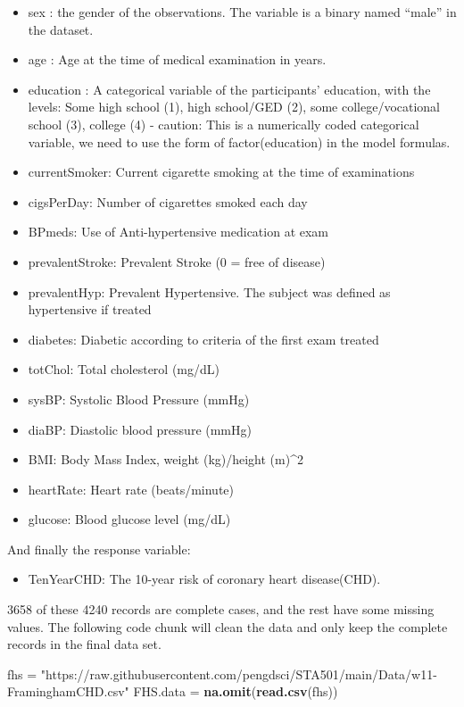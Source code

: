 \documentclass[
]{book}
\newenvironment{Shaded}{\begin{snugshade}}{\end{snugshade}}
\newcommand{\FunctionTok}[1]{\textcolor[rgb]{0.13,0.29,0.53}{\textbf{#1}}}
\newcommand{\NormalTok}[1]{#1}
\newcommand{\OtherTok}[1]{\textcolor[rgb]{0.56,0.35,0.01}{#1}}
\newcommand{\StringTok}[1]{\textcolor[rgb]{0.31,0.60,0.02}{#1}}
\providecommand{\tightlist}{%
  \setlength{\itemsep}{0pt}\setlength{\parskip}{0pt}}
\begin{document}
\begin{itemize}
\tightlist
\item
  sex : the gender of the observations. The variable is a binary named ``male'' in the dataset.
\item
  age : Age at the time of medical examination in years.
\item
  education : A categorical variable of the participants' education, with the levels: Some high school (1), high school/GED (2), some college/vocational school (3), college (4) - caution: This is a numerically coded categorical variable, we need to use the form of factor(education) in the model formulas.
\item
  currentSmoker: Current cigarette smoking at the time of examinations
\item
  cigsPerDay: Number of cigarettes smoked each day
\item
  BPmeds: Use of Anti-hypertensive medication at exam
\item
  prevalentStroke: Prevalent Stroke (0 = free of disease)
\item
  prevalentHyp: Prevalent Hypertensive. The subject was defined as hypertensive if treated
\item
  diabetes: Diabetic according to criteria of the first exam treated
\item
  totChol: Total cholesterol (mg/dL)
\item
  sysBP: Systolic Blood Pressure (mmHg)
\item
  diaBP: Diastolic blood pressure (mmHg)
\item
  BMI: Body Mass Index, weight (kg)/height (m)\^{}2
\item
  heartRate: Heart rate (beats/minute)
\item
  glucose: Blood glucose level (mg/dL)
\end{itemize}

And finally the response variable:

\begin{itemize}
\tightlist
\item
  TenYearCHD: The 10-year risk of coronary heart disease(CHD).
\end{itemize}

3658 of these 4240 records are complete cases, and the rest have some missing values. The following code chunk will clean the data and only keep the complete records in the final data set.

\begin{Shaded}
\begin{Highlighting}[]
\NormalTok{fhs }\OtherTok{=} \StringTok{"https://raw.githubusercontent.com/pengdsci/STA501/main/Data/w11{-}FraminghamCHD.csv"}
\NormalTok{FHS.data }\OtherTok{=} \FunctionTok{na.omit}\NormalTok{(}\FunctionTok{read.csv}\NormalTok{(fhs))}
\end{Highlighting}
\end{Shaded}
\end{document}

